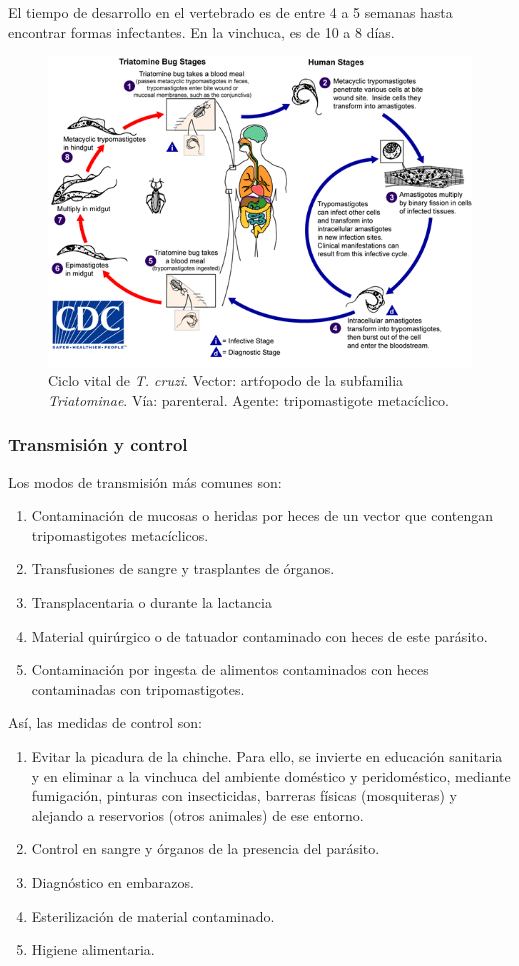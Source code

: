 El tiempo de desarrollo en el vertebrado es de entre 4 a 5 semanas hasta encontrar formas infectantes. En la vinchuca, es de 10 a 8 días.
\begin{figure}[H]
	\centering
	\includegraphics[width=0.7\columnwidth]{A.imagenes/ACV-BioSan-Parasit-TcruziCBios}
	\caption[Ciclo vital de \textit{T. cruzi}]{Ciclo vital de \textit{T. cruzi}. Vector: artŕopodo de la subfamilia \textit{Triatominae}. Vía: parenteral. Agente: tripomastigote metacíclico.\label{fig:PARASIT:TCruziCBios}}
\end{figure}
\subsubsection{Transmisión y control}
Los modos de transmisión más comunes son:
\begin{enumerate}[itemsep=0pt,parsep=0pt,topsep=0pt,partopsep=0pt]
	\item Contaminación de mucosas o heridas por heces de un vector que contengan tripomastigotes metacíclicos.
	\item Transfusiones de sangre y trasplantes de órganos.
	\item Transplacentaria o durante la lactancia
	\item Material quirúrgico o de tatuador contaminado con heces de este parásito.
	\item Contaminación por ingesta de alimentos contaminados con heces contaminadas con tripomastigotes.
\end{enumerate}
Así, las medidas de control son:
\begin{enumerate}[itemsep=0pt,parsep=0pt,topsep=0pt,partopsep=0pt] 
	\item Evitar la picadura de la chinche. Para ello, se invierte en educación sanitaria y en eliminar a la vinchuca del ambiente doméstico y peridoméstico, mediante fumigación, pinturas con insecticidas, barreras físicas (mosquiteras) y alejando a reservorios (otros animales) de ese entorno.
	\item Control en sangre y órganos de la presencia del parásito.
	\item Diagnóstico en embarazos.
	\item Esterilización de material contaminado.
	\item Higiene alimentaria.
\end{enumerate}

